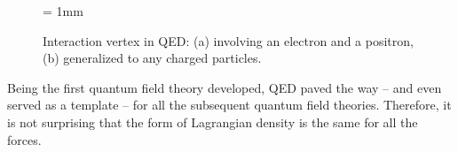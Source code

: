 \documentclass[ALICE,manyauthors]{cernphprep}
\begin{document}
\begin{figure}[H]
\begin{center}
\unitlength = 1mm
\end{center}
\caption{Interaction vertex in QED: (a) involving an electron and a positron, (b) generalized to any charged particles.}
\label{fig:FeynmanDiagramQED}
\end{figure}



Being the first quantum field theory developed, QED paved the way -- and even served as a template -- for all the subsequent quantum field theories. Therefore, it is not surprising that the form of Lagrangian density is the same for all the forces. 
\end{document}
